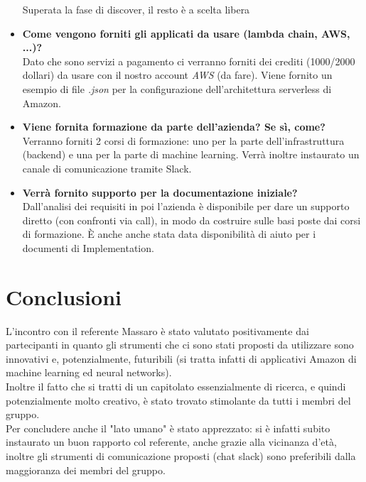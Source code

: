 \documentclass{classes/base}
\begin{document}
\begin{itemize}
            Superata la fase di discover, il resto è a scelta libera        
        \item  \textbf{Come vengono forniti gli applicati da usare (lambda chain, AWS, ...)?}
        \\Dato che sono servizi a pagamento ci verranno forniti dei crediti (1000/2000 dollari) da usare con il nostro account \textit{AWS} (da fare).
            Viene fornito un esempio di file \textit{.json} per la configurazione dell'architettura serverless di Amazon.
        \item  \textbf{Viene fornita formazione da parte dell'azienda? Se sì, come?}
        \\Verranno forniti 2 corsi di formazione: uno per la parte dell'infrastruttura (backend) e una per la parte di machine learning.
            Verrà inoltre instaurato un canale di comunicazione tramite Slack.        
        \item  \textbf{Verrà fornito supporto per la documentazione iniziale?}
        \\Dall'analisi dei requisiti in poi l'azienda è disponibile per dare un supporto diretto (con confronti via call), in modo da costruire sulle basi poste dai corsi di formazione.
        È anche anche stata data disponibilità di aiuto per i documenti di Implementation.
    \end{itemize}

    \section*{Conclusioni}
    L'incontro con il referente Massaro è stato valutato positivamente dai partecipanti in quanto gli strumenti che ci sono stati proposti da utilizzare sono innovativi e, potenzialmente, futuribili (si tratta infatti di applicativi Amazon di machine learning ed neural networks).\\
    Inoltre il fatto che si tratti di un capitolato essenzialmente di ricerca, e quindi potenzialmente molto creativo, è stato trovato stimolante da tutti i membri del gruppo.\\
    Per concludere anche il "lato umano" è stato apprezzato: si è infatti subito instaurato un buon rapporto col referente, anche grazie alla vicinanza d'età, inoltre gli strumenti di comunicazione proposti (chat slack) sono preferibili dalla maggioranza dei membri del gruppo.
\end{document}
